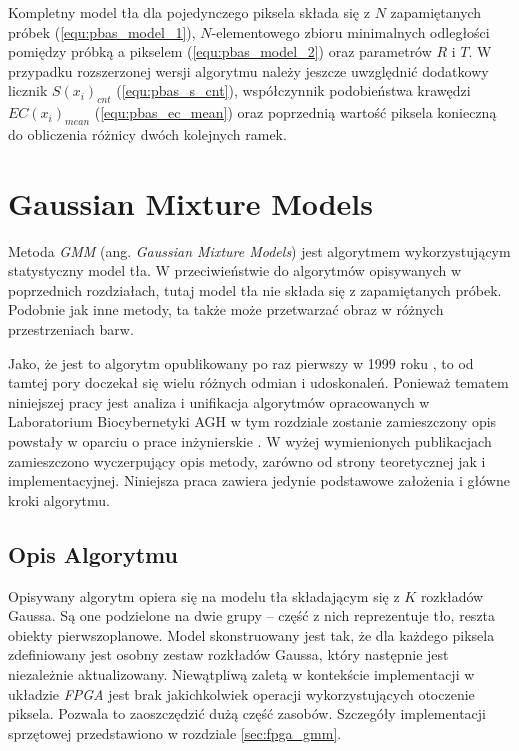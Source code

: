 Kompletny model tła dla pojedynczego piksela składa się z $N$ zapamiętanych próbek (\ref{equ:pbas_model_1}), $N$-elementowego zbioru minimalnych odległości pomiędzy próbką a pikselem (\ref{equ:pbas_model_2}) oraz parametrów $R$ i $T$. W przypadku rozszerzonej wersji algorytmu należy jeszcze uwzględnić dodatkowy licznik $S(x_i)_{cnt}$ (\ref{equ:pbas_s_cnt}), współczynnik podobieństwa krawędzi $EC(x_i)_{mean}$ (\ref{equ:pbas_ec_mean}) oraz poprzednią wartość piksela konieczną do obliczenia różnicy dwóch kolejnych ramek.


\section{Gaussian Mixture Models}
\label{sec:gmm_teoria}

Metoda \textit{GMM} (ang. \textit{Gaussian Mixture Models}) jest algorytmem wykorzystującym statystyczny model tła. 
W przeciwieństwie do algorytmów opisywanych w poprzednich rozdziałach, tutaj model tła nie składa się z zapamiętanych próbek. 
Podobnie jak inne metody, ta także może przetwarzać obraz w różnych przestrzeniach barw. 

Jako, że jest to algorytm opublikowany po raz pierwszy w 1999 roku \cite{Stauffer_Grimson_99}, to od tamtej pory doczekał się wielu różnych odmian i udoskonaleń. %
Ponieważ tematem niniejszej pracy jest analiza i unifikacja algorytmów opracowanych w Laboratorium Biocybernetyki AGH w tym rozdziale zostanie zamieszczony opis powstały w oparciu o prace inżynierskie \cite{janus_15, piszczek_15}. W wyżej wymienionych publikacjach zamieszczono wyczerpujący opis metody, zarówno od strony teoretycznej jak i implementacyjnej. Niniejsza praca zawiera jedynie podstawowe założenia i główne kroki algorytmu.


\subsection{Opis Algorytmu}
\label{subsec:gmm_opis}


Opisywany algorytm opiera się na modelu tła składającym się z $K$ rozkładów Gaussa. 
Są one podzielone na dwie grupy -- część z nich reprezentuje tło, reszta obiekty pierwszoplanowe. 
Model skonstruowany jest tak, że dla każdego piksela zdefiniowany jest osobny zestaw rozkładów Gaussa, który następnie jest niezależnie aktualizowany. 
Niewątpliwą zaletą w kontekście implementacji w układzie \textit{FPGA} jest brak jakichkolwiek operacji wykorzystujących otoczenie piksela. 
Pozwala to zaoszczędzić dużą część zasobów. 
Szczegóły implementacji sprzętowej przedstawiono w rozdziale \ref{sec:fpga_gmm}.

